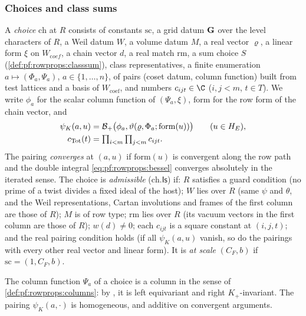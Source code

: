 \subsubsection{Choices and class sums}
\begin{definition}[Choices]\label{def:pf:rowprops:choice}
A \emph{choice} $\mathrm{ch}$ at $R$ consists of constants $\mathrm{sc}$, a grid datum $\mathbf{G}$ over the level
characters of $R$, a Weil datum $W$, a volume datum $M$, a real vector $\varrho$, a linear form $\xi$ on $W_{\mathrm
coef}$, a chain vector $d$, a real match $\mathrm{rm}$, a sum choice $S$ (\cref{def:pf:rowprops:classsum}), class
representatives, a finite enumeration $a\mapsto(\Phi_a,\Psi_a)$, $a\in\{1,\dots,n\}$, of pairs (coset datum, column
function) built from test lattices and a basis of $W_{\mathrm{coef}}$, and numbers $c_{ijt}\in\C$ ($i,j<m$, $t\in T$).
We write $\phi_a$ for the scalar column function of $(\Psi_a,\xi)$, $\mathrm{form}$ for the row form of the chain
vector, and
\begin{align}
\psi_K(a,u)&=\mathcal{B}_+\bigl(\phi_a,\vartheta(\varrho,\Phi_a;\mathrm{form}(u))\bigr)\qquad(u\in H_E),\label{eq:pf:rowprops:psiK}\\
c_{\mathrm{Tot}}(t)&=\textstyle\prod_{i<m}\prod_{j<m}c_{ijt}.\notag
\end{align}
The pairing \emph{converges} at $(a,u)$ if $\mathrm{form}(u)$ is convergent along the row path and the
double integral \eqref{eq:pf:rowprops:bessel} converges absolutely in the iterated sense. The choice is
\emph{admissible} ($\mathrm{ch}.\mathsf{Is}$) if: $R$ satisfies a guard condition (no prime of a twist divides a fixed
ideal of the host); $W$ lies over $R$ (same $\psi$ and $\theta$, and the Weil representations, Cartan involutions and
frames of the first column are those of $R$); $M$ is of row type; $\mathrm{rm}$ lies over $R$ (its vacuum vectors in
the first column are those of $R$); $w(d)\ne0$; each $c_{ijt}$ is a square constant at $(i,j,t)$; and the real
pairing condition holds (if all $\psi_K(a,u)$ vanish, so do the pairings with every other real vector and linear form).
It is \emph{at scale} $(C_F,b)$ if $\mathrm{sc}=(1,C_F,b)$.
\end{definition}

The column function $\Psi_a$ of a choice is a column in the sense of \cref{def:pf:rowprops:columns}: by
, it is left equivariant and right $K_+$-invariant. The pairing $\psi_K(a,\cdot)$
is homogeneous, and additive on convergent arguments.


